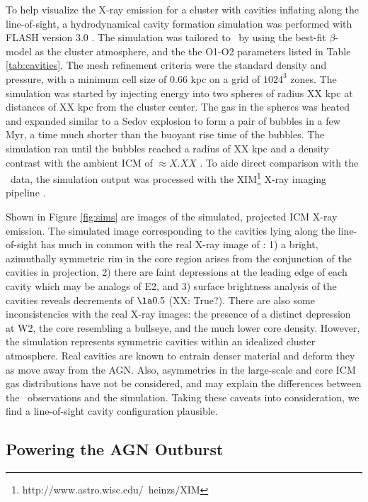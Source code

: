 \documentclass[iop]{emulateapj}
\begin{document}
To help visualize the X-ray emission for a cluster with cavities
inflating along the line-of-sight, a hydrodynamical cavity formation
simulation was performed with {\textsc{FLASH}} version 3.0
\citep{flash}. The simulation was tailored to \rbs\ by using the
best-fit $\beta$-model as the cluster atmosphere, and the the O1-O2
parameters listed in Table \ref{tab:cavities}. The mesh refinement
criteria were the standard density and pressure, with a minimum cell
size of 0.66 kpc on a grid of $1024^3$ zones. The simulation was
started by injecting energy into two spheres of radius XX kpc at
distances of XX kpc from the cluster center. The gas in the spheres
was heated and expanded similar to a Sedov explosion to form a pair of
bubbles in a few Myr, a time much shorter than the buoyant rise time
of the bubbles. The simulation ran until the bubbles reached a radius
of XX kpc and a density contrast with the ambient ICM of $\approx
X.XX$ \citep[see][]{2009arXiv0909.1805S}. To aide direct comparison
with the \cxo\ data, the simulation output was processed with the
{\textsc{XIM}}\footnote{http://www.astro.wisc.edu/~heinzs/XIM} X-ray
imaging pipeline \citep{2009arXiv0903.0043H}.

Shown in Figure \ref{fig:sims} are images of the simulated, projected
ICM X-ray emission. The simulated image corresponding to the cavities
lying along the line-of-sight has much in common with the real X-ray
image of \rbs: 1) a bright, azimuthally symmetric rim in the core
region arises from the conjunction of the cavities in projection, 2)
there are faint depressions at the leading edge of each cavity which
may be analogs of E2, and 3) surface brightness analysis of the
cavities reveals decrements of $\la 0.5$ (XX: True?). There are also
some inconsistencies with the real X-ray images: the presence of a
distinct depression at W2, the core resembling a bullseye, and the
much lower core density. However, the simulation represents symmetric
cavities within an idealized cluster atmosphere. Real cavities are
known to entrain denser material and deform they as move away from the
AGN. Also, asymmetries in the large-scale and core ICM gas
distributions have not be considered, and may explain the differences
between the \cxo\ observations and the simulation. Taking these
caveats into consideration, we find a line-of-sight cavity
configuration plausible.

\subsection{Powering the AGN Outburst}
\label{sec:accretion}
\end{document}
